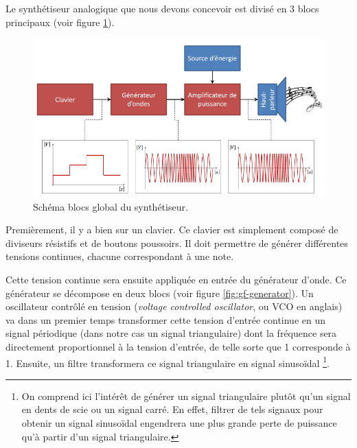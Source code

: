 

Le synthétiseur analogique que nous devons concevoir
est divisé en 3 blocs principaux (voir figure \ref{fig:gf-global}).

\begin{figure}[ht]
	\centering
	\includegraphics[scale=0.65]{img-gf/gf-global.png}
	\caption{Schéma blocs global du synthétiseur.}
	\label{fig:gf-global}
\end{figure}

Premièrement, il y a bien sur un clavier. Ce clavier est simplement
composé de diviseurs résistifs et de boutons poussoirs. Il doit
permettre de générer différentes tensions continues, chacune
correspondant à une note.

Cette tension continue sera ensuite appliquée en entrée du générateur
d'onde. Ce générateur se décompose en deux blocs (voir figure
\ref{fig:gf-generator}). Un oscillateur contrôlé en tension 
(\textit{voltage controlled oscillator}, ou VCO en anglais) va dans
un premier temps transformer cette tension d'entrée continue
en un signal périodique (dans notre cas un signal triangulaire) 
dont la fréquence sera directement proportionnel
à la tension d'entrée, de telle sorte que
\unit{1}{\milli\volt} corresponde à \unit{1}{\hertz}. Ensuite, un filtre
transformera ce signal triangulaire en signal sinusoïdal
\footnote{On comprend ici l'intérêt de générer un signal triangulaire plutôt
qu'un signal en dents de scie ou un signal carré. En effet, filtrer
de tels signaux pour obtenir un signal sinusoïdal engendrera
une plus grande perte de puissance qu'à partir d'un signal
triangulaire.}. %

